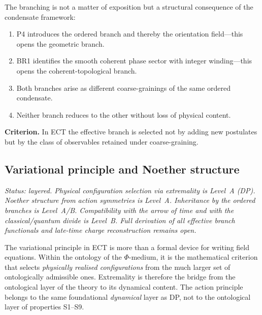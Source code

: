 \documentclass[11pt,a4paper]{article}
\numberwithin{equation}{section}
\begin{document}
The branching is not a matter of exposition but a structural
consequence of the condensate framework:
\begin{enumerate}
  \item P4 introduces the ordered branch and thereby the orientation field---this opens the geometric branch.
  \item BR1 identifies the smooth coherent phase sector with integer winding---this opens the coherent-topological branch.
  \item Both branches arise as different coarse-grainings of the same ordered condensate.
  \item Neither branch reduces to the other without loss of physical content.
\end{enumerate}
\textbf{Criterion.}
In ECT the effective branch is selected not by adding new postulates
but by the class of observables retained under coarse-graining.

\subsection{Variational principle and Noether structure}
\label{sec:noether}

\textit{Status: layered.
Physical configuration selection via extremality is Level~A (DP).
Noether structure from action symmetries is Level~A.
Inheritance by the ordered branches is Level~A/B.
Compatibility with the arrow of time and with the classical/quantum
divide is Level~B.
Full derivation of all effective branch functionals and late-time
charge reconstruction remains open.}

The variational principle in ECT is more than a formal device for
writing field equations.
Within the ontology of the $\Phi$-medium, it is the mathematical
criterion that selects \emph{physically realised configurations} from
the much larger set of ontologically admissible ones.
Extremality is therefore the bridge from the ontological layer of the
theory to its dynamical content.
The action principle belongs to the same foundational \emph{dynamical}
layer as DP, not to the ontological layer of properties S1--S9.
\end{document}
